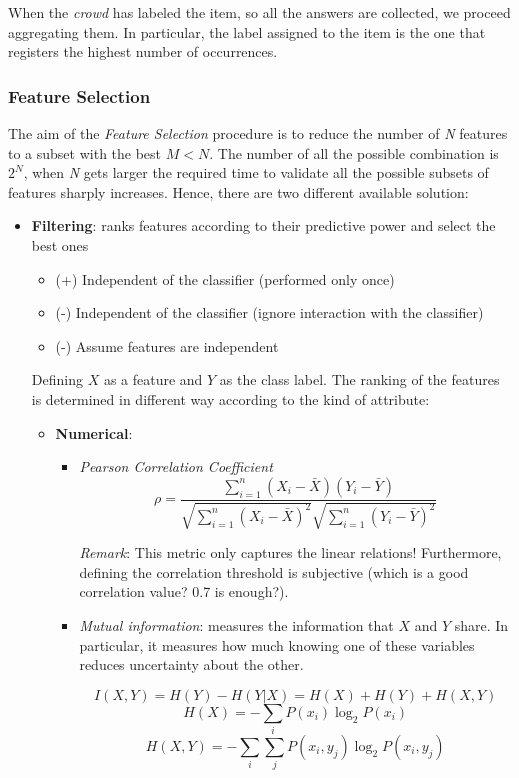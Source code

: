 When the \emph{crowd} has labeled the item, so all the answers are collected, we proceed aggregating them. In particular, the label assigned to the item is the one that registers the highest number of occurrences.

\subsubsection*{Feature Selection}

The aim of the \emph{Feature Selection} procedure is to reduce the number of \emph{N} features to a subset with the best $M < N$. The number of all the possible combination is $2^N$, when \emph{N} gets larger the required time to validate all the possible subsets of features sharply increases. Hence, there are two different available solution:
\begin{itemize}
\item \textbf{Filtering}: ranks features according to their predictive power and select the best ones
\begin{itemize}
\item (+) Independent of the classifier (performed only once)
\item (-) Independent of the classifier (ignore interaction with the classifier)
\item (-) Assume features are independent
\end{itemize}

Defining $X$ as a feature and $Y$ as the class label. The ranking of the features is determined in different way according to the kind of attribute:
\begin{itemize}
\item \textbf{Numerical}:
\begin{itemize}
\item \emph{Pearson Correlation Coefficient}
$$\rho = \frac{\sum_{i=1}^{n}(X_i - \bar{X})(Y_i - \bar{Y})}{\sqrt{\sum_{i=1}^{n}(X_i - \bar{X})^2}\sqrt{\sum_{i=1}^{n}(Y_i - \bar{Y})^2}}$$

\emph{Remark}: This metric only captures the linear relations! Furthermore, defining the correlation threshold is subjective (which is a good correlation value? 0.7 is enough?).

\item \emph{Mutual information}: measures the information that $X$ and $Y$ share. In particular, it measures how much knowing one of these variables reduces uncertainty about the other. 

$$ I(X,Y) = H(Y) - H(Y|X) = H(X) + H(Y) + H(X,Y)$$
$$ H(X) = - \sum_{i}P(x_i)\log_2 P(x_i)$$
$$ H(X,Y) = - \sum_{i}\sum_{j}P(x_i, y_j)\log_2 P(x_i, y_j)$$


\end{itemize}
\end{itemize}
\end{itemize}
